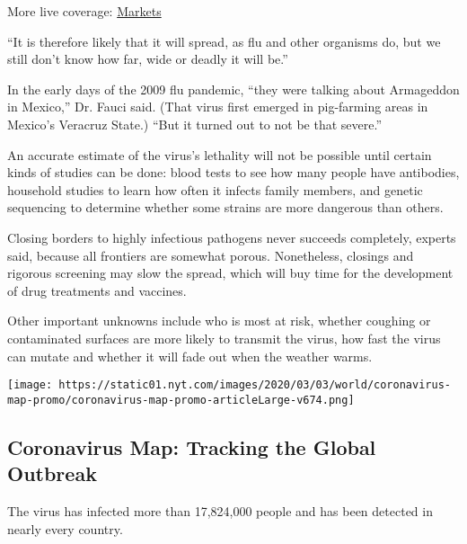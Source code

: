 More live coverage:
\href{https://www.nytimes.com/live/2020/07/31/business/stock-market-today-coronavirus?action=click\&pgtype=Article\&state=default\&region=MAIN_CONTENT_1\&context=storylines_live_updates}{Markets}

``It is therefore likely that it will spread, as flu and other organisms
do, but we still don't know how far, wide or deadly it will be.''

In the early days of the 2009 flu pandemic, ``they were talking about
Armageddon in Mexico,'' Dr. Fauci said. (That virus first emerged in
pig-farming areas in Mexico's Veracruz State.) ``But it turned out to
not be that severe.''

An accurate estimate of the virus's lethality will not be possible until
certain kinds of studies can be done: blood tests to see how many people
have antibodies, household studies to learn how often it infects family
members, and genetic sequencing to determine whether some strains are
more dangerous than others.

Closing borders to highly infectious pathogens never succeeds
completely, experts said, because all frontiers are somewhat porous.
Nonetheless, closings and rigorous screening may slow the spread, which
will buy time for the development of drug treatments and vaccines.

Other important unknowns include who is most at risk, whether coughing
or contaminated surfaces are more likely to transmit the virus, how fast
the virus can mutate and whether it will fade out when the weather
warms.

\href{https://www.nytimes.com/interactive/2020/world/coronavirus-maps.html}{}

\texttt{[image: https://static01.nyt.com/images/2020/03/03/world/coronavirus-map-promo/coronavirus-map-promo-articleLarge-v674.png]}

\hypertarget{coronavirus-map-tracking-the-global-outbreak}{%
\subsection{Coronavirus Map: Tracking the Global
Outbreak}\label{coronavirus-map-tracking-the-global-outbreak}}

The virus has infected more than 17,824,000 people and has been detected
in nearly every country.

